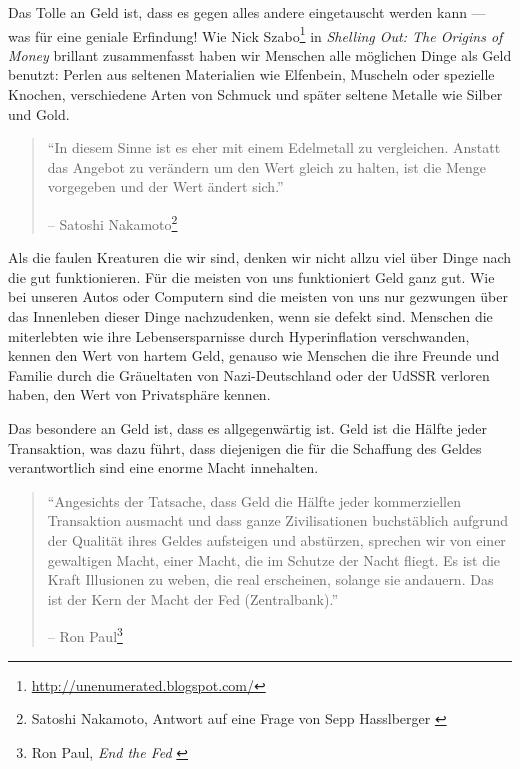Das Tolle an Geld ist, dass es gegen alles andere eingetauscht werden kann ---
was für eine geniale Erfindung! Wie Nick
Szabo\footnote{\url{http://unenumerated.blogspot.com/}} in \textit{Shelling Out:
The Origins of Money} \cite{shelling-out} brillant zusammenfasst haben wir
Menschen alle möglichen Dinge als Geld benutzt: Perlen aus seltenen Materialien
wie Elfenbein, Muscheln oder spezielle Knochen, verschiedene Arten von Schmuck
und später seltene Metalle wie Silber und Gold.

\begin{quotation}\begin{samepage}
\enquote{In diesem Sinne ist es eher mit einem Edelmetall zu vergleichen. Anstatt das Angebot zu verändern um den Wert gleich zu halten, ist die Menge vorgegeben und der Wert ändert sich.}
\begin{flushright} -- Satoshi Nakamoto\footnote{Satoshi Nakamoto, Antwort auf eine Frage von Sepp
Hasslberger \cite{satoshi-precious-metal}}
\end{flushright}\end{samepage}\end{quotation}

Als die faulen Kreaturen die wir sind, denken wir nicht allzu viel über Dinge
nach die gut funktionieren. Für die meisten von uns funktioniert Geld ganz gut.
Wie bei unseren Autos oder Computern sind die meisten von uns nur gezwungen über
das Innenleben dieser Dinge nachzudenken, wenn sie defekt sind. Menschen die
miterlebten wie ihre Lebensersparnisse durch Hyperinflation verschwanden, kennen
den Wert von hartem Geld, genauso wie Menschen die ihre Freunde und Familie
durch die Gräueltaten von Nazi-Deutschland oder der UdSSR verloren haben, den
Wert von Privatsphäre kennen.

Das besondere an Geld ist, dass es allgegenwärtig ist. Geld ist die Hälfte jeder
Transaktion, was dazu führt, dass diejenigen die für die Schaffung des Geldes
verantwortlich sind eine enorme Macht innehalten.

\begin{quotation}\begin{samepage}
\enquote{Angesichts der Tatsache, dass Geld die Hälfte jeder kommerziellen
Transaktion ausmacht und dass ganze Zivilisationen buchstäblich aufgrund der
Qualität ihres Geldes aufsteigen und abstürzen, sprechen wir von einer
gewaltigen Macht, einer Macht, die im Schutze der Nacht fliegt. Es ist die Kraft
Illusionen zu weben, die real erscheinen, solange sie andauern. Das ist der Kern
der Macht der Fed (Zentralbank).}
\begin{flushright} -- Ron Paul\footnote{Ron Paul, \textit{End the Fed} \cite{end-the-fed}}
\end{flushright}\end{samepage}\end{quotation}

